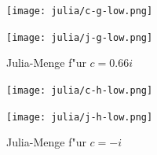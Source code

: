 \begin{refsection}
\begin{figure}
\begin{center}
\texttt{[image: julia/c-g-low.png]}

\bigskip

\texttt{[image: julia/j-g-low.png]}
\end{center}
\caption{Julia-Menge f"ur $c= 0.66i$\label{julia:g}}
\end{figure}

\begin{figure}
\begin{center}
\texttt{[image: julia/c-h-low.png]}

\bigskip

\texttt{[image: julia/j-h-low.png]}
\end{center}
\caption{Julia-Menge f"ur $c= -i$\label{julia:h}}
\end{figure}

\printbibliography[heading=subbibliography]
\end{refsection}

